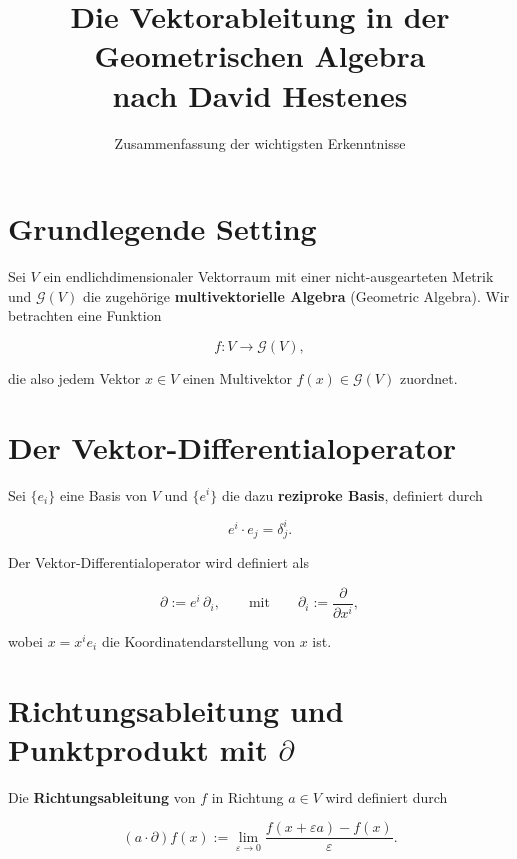 \documentclass[11pt]{article}
\title{Die Vektorableitung in der Geometrischen Algebra \\ nach David Hestenes}
\author{Zusammenfassung der wichtigsten Erkenntnisse}
\date{}
\begin{document}
\maketitle

\section{Grundlegende Setting}

Sei \(V\) ein endlichdimensionaler Vektorraum mit einer nicht-ausgearteten Metrik und \(\mathcal G(V)\) die zugehörige \textbf{multivektorielle Algebra} (Geometric Algebra). Wir betrachten eine Funktion

\[
f: V \longrightarrow \mathcal G(V),
\]

die also jedem Vektor \(x \in V\) einen Multivektor \(f(x) \in \mathcal G(V)\) zuordnet.

\section{Der Vektor-Differentialoperator}

Sei \(\{e_i\}\) eine Basis von \(V\) und \(\{e^i\}\) die dazu \textbf{reziproke Basis}, definiert durch

\[
\boxed{e^i \cdot e_j = \delta^i_j}.
\]

Der Vektor-Differentialoperator wird definiert als

\[
\boxed{\partial := e^i \, \partial_i},
\qquad\text{mit}\qquad
\partial_i := \frac{\partial}{\partial x^i},
\]

wobei \(x = x^i e_i\) die Koordinatendarstellung von \(x\) ist.

\begin{center}
\end{center}

\section{Richtungsableitung und Punktprodukt mit \(\partial\)}

Die \textbf{Richtungsableitung} von \(f\) in Richtung \(a \in V\) wird definiert durch

\[
\boxed{
(a \cdot \partial) f(x)
:=
\lim_{\varepsilon \to 0}
\frac{f(x + \varepsilon a) - f(x)}{\varepsilon}
}.
\]
\end{document}
